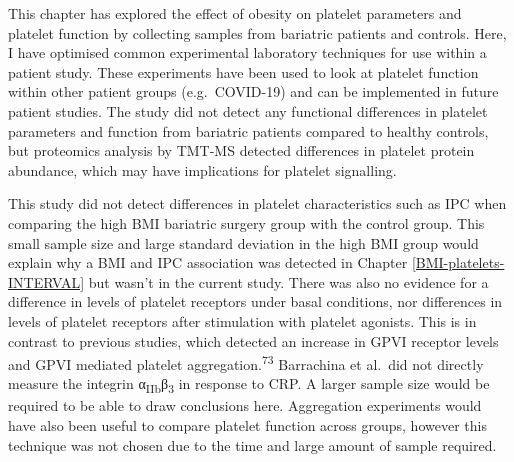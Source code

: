 \documentclass[11pt,twoside]{bristolthesis}
\begin{document}
This chapter has explored the effect of obesity on platelet parameters and platelet function by collecting samples from bariatric patients and controls. Here, I have optimised common experimental laboratory techniques for use within a patient study. These experiments have been used to look at platelet function within other patient groups (e.g.~COVID-19) and can be implemented in future patient studies. The study did not detect any functional differences in platelet parameters and function from bariatric patients compared to healthy controls, but proteomics analysis by TMT-MS detected differences in platelet protein abundance, which may have implications for platelet signalling.

This study did not detect differences in platelet characteristics such as IPC when comparing the high BMI bariatric surgery group with the control group. This small sample size and large standard deviation in the high BMI group would explain why a BMI and IPC association was detected in Chapter \ref{BMI-platelets-INTERVAL} but wasn't in the current study. There was also no evidence for a difference in levels of platelet receptors under basal conditions, nor differences in levels of platelet receptors after stimulation with platelet agonists. This is in contrast to previous studies, which detected an increase in GPVI receptor levels and GPVI mediated platelet aggregation.\textsuperscript{73} Barrachina et al.~did not directly measure the integrin α\textsubscript{IIb}β\textsubscript{3} in response to CRP. A larger sample size would be required to be able to draw conclusions here. Aggregation experiments would have also been useful to compare platelet function across groups, however this technique was not chosen due to the time and large amount of sample required.
\end{document}

